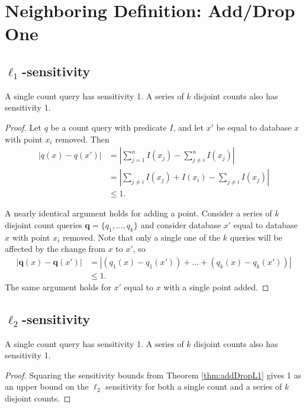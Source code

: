 \documentclass[11pt]{scrartcl} %
\begin{document}
\section{Neighboring Definition: Add/Drop One}
\subsection{$\ell_1$-sensitivity}
\begin{theorem}
\label{thm:addDropL1}
A single count query has sensitivity 1. A series of $k$ disjoint counts also has sensitivity 1.
\end{theorem}

\begin{proof}
Let $q$ be a count query with predicate $I$, and let $x'$ be equal to database $x$ with point $x_i$ removed. Then 
\begin{align*}
\left \vert q(x) - q(x') \right\vert &= \left\vert \sum_{j=1}^n I(x_j) - \sum_{j\ne i}^n I(x_j) \right\vert\\
	&= \left\vert \sum_{j \ne i} I(x_j) + I(x_i) - \sum_{j\ne i} I(x_j) \right\vert\\
	&\le 1.
\end{align*}

A nearly identical argument holds for adding a point. 
Consider a series of $k$ disjoint count queries $\mathbf{q} = \{q_1, \ldots, q_k\}$ and consider database $x'$ equal to database $x$ with point $x_i$ removed. Note that only a single one of the $k$ queries will be affected by the change from $x$ to $x'$, so
\begin{align*}
\left\vert \mathbf{q}(x) - \mathbf{q}(x') \right\vert &= \left\vert \left(q_1(x) - q_1(x')\right) + \ldots + \left(q_k(x) - q_k(x')\right) \right\vert \\
	&\le 1.
\end{align*}
The same argument holds for $x'$ equal to $x$ with a single point added.
\end{proof}
\subsection{$\ell_2$-sensitivity}
\begin{theorem}
A single count query has sensitivity 1. A series of $k$ disjoint counts also has sensitivity 1.
\end{theorem}

\begin{proof}
Squaring the sensitivity bounds from Theorem \ref{thm:addDropL1} gives 1 as an upper bound on the $\ell_2$ sensitivity for both a single count and a series of $k$ disjoint counts.
\end{proof}
% 
% 
\end{document}
